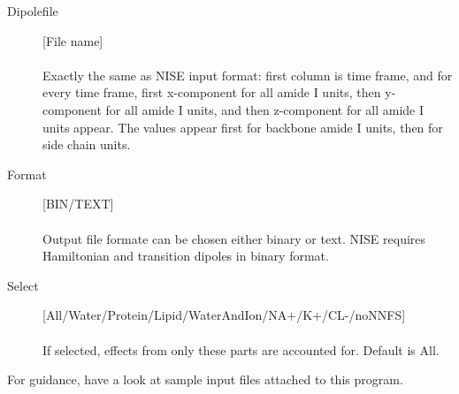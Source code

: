 \documentclass[12pt]{book}
\begin{document}
\begin{description}
\item [Dipolefile] [File name] \\\\ Exactly the same as NISE input format: first column is time frame, and for every time frame, first x-component for all amide I units, then y-component for all amide I units, and then z-component for all amide I units appear. The values appear first for backbone amide I units, then for side chain units.
\item [Format] [BIN/TEXT] \\\\ Output file formate can be chosen either binary or text. NISE requires Hamiltonian and transition dipoles in binary format.
\item [Select][All/Water/Protein/Lipid/WaterAndIon/NA+/K+/CL-/noNNFS] \\\\ If selected, effects from only these parts are accounted for. Default is All.
\end{description}
For guidance, have a look at sample input files attached to this program.


\end{document}

